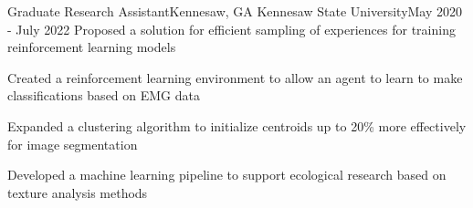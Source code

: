 \resumeSubheading
{Graduate Research Assistant}{Kennesaw, GA}
{Kennesaw State University}{May 2020 - July 2022}
\resumeItemListStart
\resumeItem
{
    Proposed a solution for efficient sampling of experiences for training
    reinforcement learning models
}

\resumeItem
{
    Created a reinforcement learning environment to allow an
    agent to learn to make classifications based on EMG data
}

\resumeItem
{
    Expanded a clustering algorithm to initialize centroids up to 20\% more effectively for
    image segmentation
}

\resumeItem
{
    Developed a machine learning pipeline to support ecological research based on
    texture analysis methods
}
\resumeItemListEnd




